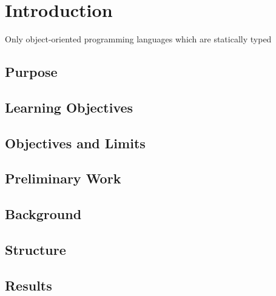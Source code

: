 \chapter{Introduction}
Only object-oriented programming languages which are statically typed

\section{Purpose}

\section{Learning Objectives}

\section{Objectives and Limits}

\section{Preliminary Work}

\section{Background}

\section{Structure}

\section{Results}

